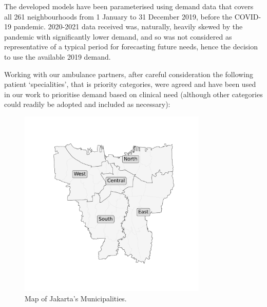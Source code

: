 \documentclass[preprint,12pt]{elsarticle}
\begin{document}


The developed models have been parameterised using demand data that covers all 261 neighbourhoods from 1 January to 31 December 2019, before the COVID-19 pandemic. 2020-2021 data received was, naturally, heavily skewed by the pandemic with significantly  lower demand, and so was not considered as representative of a typical period for forecasting future needs, hence the decision to use the available 2019 demand.  

Working with our ambulance partners, after careful consideration the following patient `specialities', that is priority categories, were agreed and have been used in our work to prioritise demand based on clinical need (although other categories could readily be adopted and included as necessary):

\begin{figure}
\begin{center}
\includegraphics[width=0.8\textwidth]{img/jakarta_region_names.pdf}
\end{center}
\caption{Map of Jakarta's Municipalities.}
\label{fig:region_names}
\end{figure}
\end{document}
